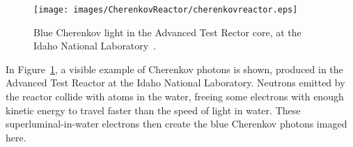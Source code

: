   \begin{figure}[ht]
    \centering
    \texttt{[image: images/CherenkovReactor/cherenkovreactor.eps]}
    \caption[Chernekov Light from a Reactor]{
      Blue Cherenkov light in the Advanced Test Rector core, at the Idaho National Laboratory~\cite{cherenkovreactor,atrlab}.
    }
    \label{fig:cherenkovreactor}
  \end{figure}
  
  In Figure~\ref{fig:cherenkovreactor}, a visible example of Cherenkov photons is shown, produced in the Advanced Test Reactor at the Idaho National Laboratory.
  Neutrons emitted by the reactor collide with atoms in the water, freeing some electrons with enough kinetic energy to travel faster than the speed of light in water.
  These superluminal-in-water electrons then create the blue Cherenkov photons imaged here.
  
